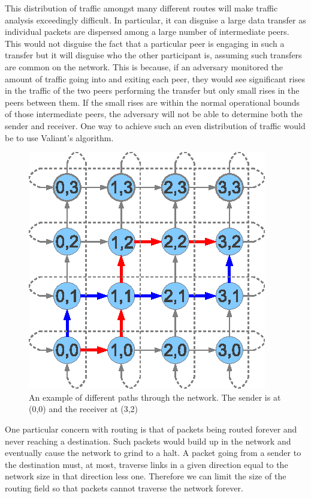 \documentclass[ %
                    author={Luke Murray},
                supervisor={Dr. Simon Hollis},
                     title={Shadow Peer-to-Peer Networks},
                  subtitle={},
                    degree={MEng},
                      year={2013} ]{thesis}
\begin{document}
This distribution of traffic amongst many different routes will make traffic analysis exceedingly difficult. In particular, it can disguise a large data transfer as individual packets are dispersed among a large number of intermediate peers. This would not disguise the fact that a particular peer is engaging in such a transfer but it will disguise who the other participant is, assuming such transfers are common on the network. This is because, if an adversary monitored the amount of traffic going into and exiting each peer, they would see significant rises in the traffic of the two peers performing the transfer but only small rises in the peers between them. If the small rises are within the normal operational bounds of those intermediate peers, the adversary will not be able to determine both the sender and receiver. One way to achieve such an even distribution of traffic would be to use Valiant's algorithm\cite{valiant1982scheme}.

\begin{figure}[h]
\centering
\includegraphics{diagrams/network_path.eps}
\caption{An example of different paths through the network. The sender is at (0,0) and the receiver at (3,2)}
\label{path}
\end{figure}

One particular concern with routing is that of packets being routed forever and never reaching a destination. Such packets would build up in the network and eventually cause the network to grind to a halt. A packet going from a sender to the destination must, at most, traverse links in a given direction equal to the network size in that direction less one. Therefore we can limit the size of the routing field so that packets cannot traverse the network forever.
\end{document}
